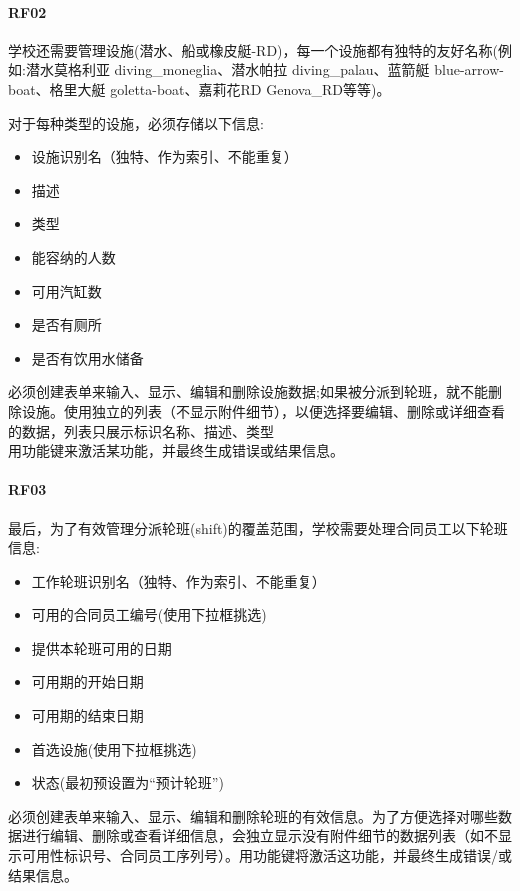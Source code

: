 \hypertarget{rf02}{%
\paragraph{RF02}\label{rf02}}

学校还需要管理设施(潜水、船或橡皮艇-RD)，每一个设施都有独特的友好名称(例如:潜水莫格利亚
diving\_moneglia、潜水帕拉 diving\_palau、蓝箭艇
blue-arrow-boat、格里大艇 goletta-boat、嘉莉花RD Genova\_RD等等)。

对于每种类型的设施，必须存储以下信息:

\begin{itemize}
\tightlist
\item
  设施识别名（独特、作为索引、不能重复）
\item
  描述
\item
  类型
\item
  能容纳的人数
\item
  可用汽缸数
\item
  是否有厕所
\item
  是否有饮用水储备
\end{itemize}

必须创建表单来输入、显示、编辑和删除设施数据;如果被分派到轮班，就不能删除设施。使用独立的列表（不显示附件细节），以便选择要编辑、删除或详细查看的数据，列表只展示标识名称、描述、类型\\
用功能键来激活某功能，并最终生成错误或结果信息。

\hypertarget{rf03}{%
\paragraph{RF03}\label{rf03}}

最后，为了有效管理分派轮班(shift)的覆盖范围，学校需要处理合同员工以下轮班信息:

\begin{itemize}
\tightlist
\item
  工作轮班识别名（独特、作为索引、不能重复）
\item
  可用的合同员工编号(使用下拉框挑选)
\item
  提供本轮班可用的日期
\item
  可用期的开始日期
\item
  可用期的结束日期
\item
  首选设施(使用下拉框挑选)
\item
  状态(最初预设置为``预计轮班'')
\end{itemize}

必须创建表单来输入、显示、编辑和删除轮班的有效信息。为了方便选择对哪些数据进行编辑、删除或查看详细信息，会独立显示没有附件细节的数据列表（如不显示可用性标识号、合同员工序列号）。用功能键将激活这功能，并最终生成错误/或结果信息。

